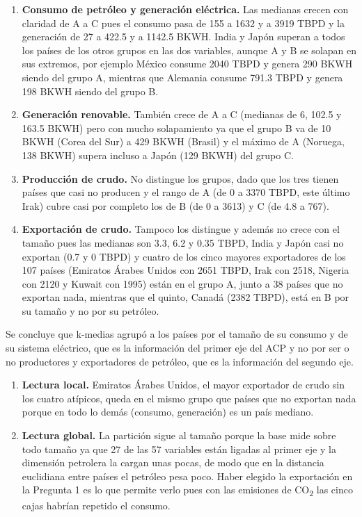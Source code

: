 \documentclass[oneside, openany, fontset=libertinus]{mitthesis}
\providecommand{\tightlist}{\setlength{\itemsep}{0pt}\setlength{\parskip}{0pt}}
\begin{document}
\begin{enumerate}
\def\labelenumi{\alph{enumi}.}
\tightlist
\item
  \textbf{Consumo de petróleo y generación eléctrica.} Las medianas
  crecen con claridad de A a C pues el consumo pasa de 155 a 1632 y a
  3919 TBPD y la generación de 27 a 422.5 y a 1142.5 BKWH. India y Japón
  superan a todos los países de los otros grupos en las dos variables,
  aunque A y B se solapan en sus extremos, por ejemplo México consume
  2040 TBPD y genera 290 BKWH siendo del grupo A, mientras que Alemania
  consume 791.3 TBPD y genera 198 BKWH siendo del grupo B.
\item
  \textbf{Generación renovable.} También crece de A a C (medianas de 6,
  102.5 y 163.5 BKWH) pero con mucho solapamiento ya que el grupo B va
  de 10 BKWH (Corea del Sur) a 429 BKWH (Brasil) y el máximo de A
  (Noruega, 138 BKWH) supera incluso a Japón (129 BKWH) del grupo C.
\item
  \textbf{Producción de crudo.} No distingue los grupos, dado que los
  tres tienen países que casi no producen y el rango de A (de 0 a 3370
  TBPD, este último Irak) cubre casi por completo los de B (de 0 a 3613)
  y C (de 4.8 a 767).
\item
  \textbf{Exportación de crudo.} Tampoco los distingue y además no crece
  con el tamaño pues las medianas son 3.3, 6.2 y 0.35 TBPD, India y
  Japón casi no exportan (0.7 y 0 TBPD) y cuatro de los cinco mayores
  exportadores de los 107 países (Emiratos Árabes Unidos con 2651 TBPD,
  Irak con 2518, Nigeria con 2120 y Kuwait con 1995) están en el grupo
  A, junto a 38 países que no exportan nada, mientras que el quinto,
  Canadá (2382 TBPD), está en B por su tamaño y no por su petróleo.
\end{enumerate}

Se concluye que k-medias agrupó a los países por el tamaño de su consumo
y de su sistema eléctrico, que es la información del primer eje del ACP
y no por ser o no productores y exportadores de petróleo, que es la
información del segundo eje.

\begin{enumerate}
\def\labelenumi{\alph{enumi}.}
\tightlist
\item
  \textbf{Lectura local.} Emiratos Árabes Unidos, el mayor exportador de
  crudo sin los cuatro atípicos, queda en el mismo grupo que países que
  no exportan nada porque en todo lo demás (consumo, generación) es un
  país mediano.
\item
  \textbf{Lectura global.} La partición sigue al tamaño porque la base
  mide sobre todo tamaño ya que 27 de las 57 variables están ligadas al
  primer eje y la dimensión petrolera la cargan unas pocas, de modo que
  en la distancia euclidiana entre países el petróleo pesa poco. Haber
  elegido la exportación en la Pregunta 1 es lo que permite verlo pues
  con las emisiones de CO\textsubscript{2} las cinco cajas habrían
  repetido el consumo.
\end{enumerate}
\end{document}
